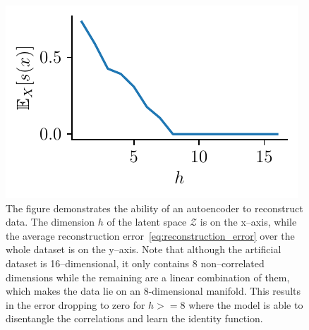 \begin{figure}
\begin{centering}
\includegraphics[scale=1.0]{data/chapter_intro/ae_reconstruction}\caption{The figure demonstrates the ability of an autoencoder to reconstruct data. The dimension $h$ of the latent space $\mathcal{Z}$ is on the x--axis, while the average reconstruction error~\eqref{eq:reconstruction_error} over the whole dataset is on the y--axis. Note that although the artificial dataset is 16--dimensional, it only contains 8 non--correlated dimensions while the remaining are a linear combination of them, which makes the data lie on an 8-dimensional manifold. This results in the error dropping to zero for $h>=8$ where the model is able to disentangle the correlations and learn the identity function.}
\label{fig:ae_reconstruction}
\par\end{centering}
\end{figure}

